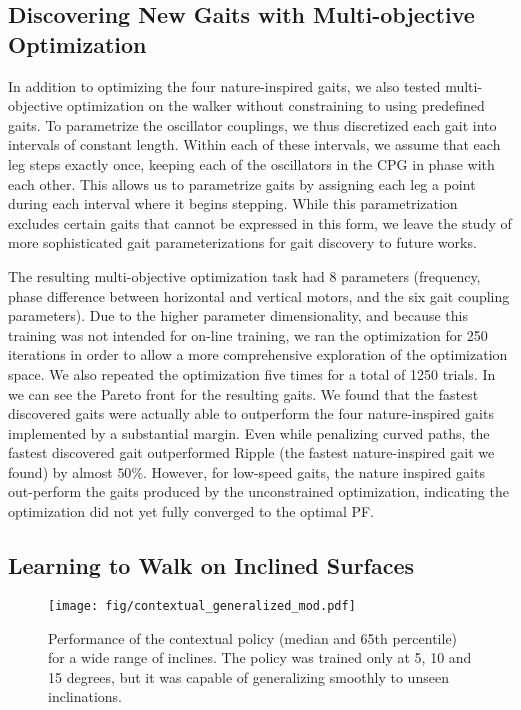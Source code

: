 \subsection{Discovering New Gaits with Multi-objective Optimization}

	In addition to optimizing the four nature-inspired gaits, we also tested multi-objective optimization on the walker without constraining to using predefined gaits.
	To parametrize the oscillator couplings, we thus discretized each gait into intervals of constant length.
	Within each of these intervals, we assume that each leg steps exactly once, keeping each of the oscillators in the CPG in phase with each other.
	This allows us to parametrize gaits by assigning each leg a point during each interval where it begins stepping.
	While this parametrization excludes certain gaits that cannot be expressed in this form, we leave the study of more sophisticated gait parameterizations for gait discovery to future works.
	
	The resulting multi-objective optimization task had 8 parameters (frequency, phase difference between horizontal and vertical motors, and the six gait coupling parameters).
	Due to the higher parameter dimensionality, and because this training was not intended for on-line training, we ran the optimization for 250 iterations in order to allow a more comprehensive exploration of the optimization space.
	We also repeated the optimization five times for a total of 1250 trials.
	In  we can see the Pareto front for the resulting gaits.
	We found that the fastest discovered gaits were actually able to outperform the four nature-inspired gaits implemented by a substantial margin.
	Even while penalizing curved paths, the fastest discovered gait outperformed Ripple (the fastest nature-inspired gait we found) by almost $50\%$.
	However, for low-speed gaits, the nature inspired gaits out-perform the gaits produced by the unconstrained optimization, indicating the optimization did not yet fully converged to the optimal PF.
	
\subsection{Learning to Walk on Inclined Surfaces}
\label{sec:results:context1}
	\begin{figure}[t]
	  \centering
	  \texttt{[image: fig/contextual\_generalized\_mod.pdf]}
	  \caption{Performance of the contextual policy (median and 65th percentile) for a wide range of inclines. The policy was trained only at 5, 10 and 15 degrees, but it was capable of generalizing smoothly to unseen inclinations. 
	  }
	  \label{fig:incline}
	\end{figure}
    
